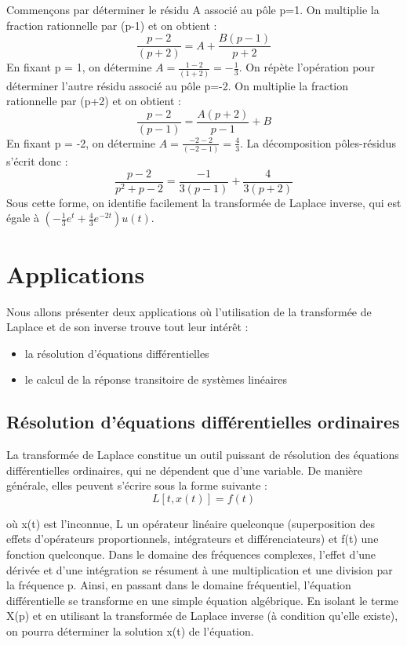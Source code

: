 	Commençons par déterminer le résidu A associé au pôle p=1. On multiplie la fraction rationnelle par (p-1) et on obtient :
	\begin{equation*}
	\frac{p-2}{(p+2)}=A+\frac{B(p-1)}{p+2}
	\end{equation*}
	En fixant p = 1, on détermine $A=\frac{1-2}{(1+2)}=-\frac{1}{3}$. On répète l'opération pour déterminer l'autre résidu associé au pôle p=-2. On multiplie la fraction rationnelle par (p+2) et on obtient :
	\begin{equation*}
	\frac{p-2}{(p-1)}=\frac{A(p+2)}{p-1}+B
	\end{equation*}
	En fixant p = -2, on détermine $A=\frac{-2-2}{(-2-1)}=\frac{4}{3}$. La décomposition pôles-résidus s'écrit donc :
	\begin{equation*}
	\frac{p-2}{p^{2}+p-2}=\frac{-1}{3(p-1)}+\frac{4}{3(p+2)}
	\end{equation*}
	Sous cette forme, on identifie facilement la transformée de Laplace inverse, qui est égale à $(-\frac{1}{3}e^{t}+\frac{4}{3}e^{-2t})u(t)$.
	
	
	\vspace{1\baselineskip}
	

	
	\section{Applications} 
	Nous allons présenter deux applications où l'utilisation de la transformée de Laplace et de son inverse trouve tout leur intérêt : 
	\begin{itemize}
		\item la résolution d'équations différentielles
		\item le calcul de la réponse transitoire de systèmes linéaires
	\end{itemize}
	
	\subsection{Résolution d'équations différentielles ordinaires}
	La transformée de Laplace constitue un outil puissant de résolution des équations différentielles ordinaires, qui ne dépendent que d'une variable. De manière générale, elles peuvent s'écrire sous la forme suivante :
	\begin{equation}\label{key}
	L[t,x(t)]=f(t)
	\end{equation}
	
	où x(t) est l'inconnue, L un opérateur linéaire quelconque (superposition des effets d'opérateurs proportionnels, intégrateurs et différenciateurs) et f(t) une fonction quelconque. Dans le domaine des fréquences complexes, l'effet d'une dérivée et d'une intégration se résument à une multiplication et une division par la fréquence p. Ainsi, en passant dans le domaine fréquentiel, l'équation différentielle se transforme en une simple équation algébrique. En isolant le terme X(p) et en utilisant la transformée de Laplace inverse (à condition qu'elle existe), on pourra déterminer la solution x(t) de l'équation.
	
